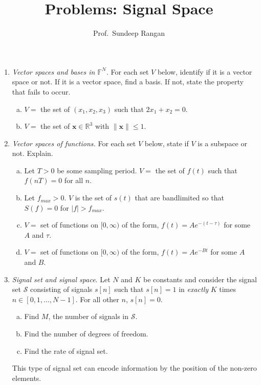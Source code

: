 \documentclass[11pt]{article}
\def\F{{\mathbb{F}}}
\def\R{{\mathbb{R}}}
\newcommand{\xbf}{\mathbf{x}}
\begin{document}
\title{Problems:  Signal Space}
\author{Prof.\ Sundeep Rangan}
\date{}

\maketitle

\begin{enumerate}

\item \emph{Vector spaces and bases in $\F^N$.}  For each set $V$ below,
identify if it is a vector space or not.  If it is a vector space, find a basis.
If not, state the property that fails to occur.
\begin{enumerate}[(a)]
  \item $V = $ the set of $(x_1,x_2,x_3)$ such that $2x_1 + x_2 = 0$.
  \item $V = $ the set of $\xbf \in \R^3$ with $\|\xbf\|\leq 1$.
\end{enumerate}

\item \emph{Vector spaces of functions.}  For each set $V$ below,
state if $V$ is a subspace or not.  Explain.
\begin{enumerate}[(a)]
  \item Let $T> 0$ be some sampling period.
  $V = $ the set of $f(t)$ such that $f(nT)=0$ for all $n$.
  \item Let $f_{max} > 0$.  $V$ is the set of $s(t)$ that are bandlimited so that
  $S(f)=0$ for $|f| > f_{max}$.
  \item $V=$ set of functions on $[0,\infty)$ of the form, $f(t) = Ae^{-(t-\tau)}$ for 
  some $A$ and $\tau$.
  \item $V=$ set of functions on $[0,\infty)$ of the form, $f(t) = Ae^{-Bt}$ for some $A$ and $B$.
\end{enumerate}


\item \emph{Signal set and signal space}. Let $N$ and $K$ be constants and
consider the signal set ${\mathcal S}$ consisting
of signals $s[n]$ such that $s[n]=1$ in \emph{exactly} $K$ times $n\in [0,1,\ldots,N-1]$.
For all other $n$, $s[n]=0$.
\begin{enumerate}[(a)]
\item Find $M$, the number of signals in ${\mathcal S}$.
\item Find the number of degrees of freedom.
\item Find the rate of signal set.
\end{enumerate}
This type of signal set can encode information by the position of the non-zero elements.



\end{enumerate}
\end{document}
